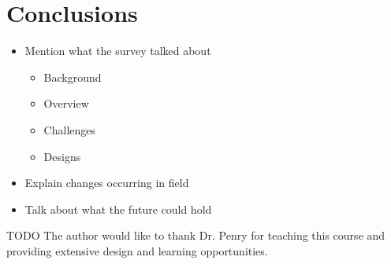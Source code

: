 \documentclass[prodmode,acmtecs]{acmsmall} %
\begin{document}
\section{Conclusions} \label{sec:conclusions}
\begin{itemize}
\item Mention what the survey talked about
  \begin{itemize}
  \item Background
  \item Overview
  \item Challenges
  \item Designs
  \end{itemize}
\item Explain changes occurring in field
\item Talk about what the future could hold
\end{itemize}

\begin{acks}
TODO The author would like to thank Dr. Penry for teaching this course and
providing extensive design and learning opportunities.
\end{acks}

% 
% 

\end{document}
